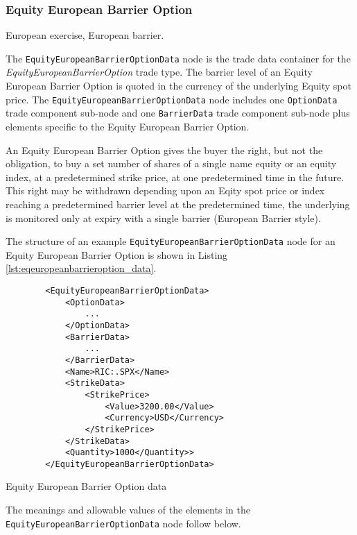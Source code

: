 \subsubsection{Equity European Barrier Option}

European exercise, European barrier.

The \lstinline!EquityEuropeanBarrierOptionData!  node is the trade data container for the \emph{EquityEuropeanBarrierOption} trade type. The barrier level of an Equity European Barrier Option is quoted in the currency of the 
underlying Equity spot price. The \lstinline!EquityEuropeanBarrierOptionData!  node includes one  \lstinline!OptionData! trade component sub-node and one \lstinline!BarrierData! trade component sub-node plus elements
specific to the Equity European Barrier Option. 

An Equity European Barrier Option gives the buyer the right, but not the obligation, to buy 
a set number of shares of a single name equity or an equity index, at a 
predetermined strike price, at one predetermined time in the future. This right may be withdrawn depending upon
an Eqity spot price or index reaching a predetermined barrier level at the predetermined time, the
underlying is monitored only at expiry with a single barrier (European Barrier style).

The structure of an example \lstinline!EquityEuropeanBarrierOptionData! node for an Equity European Barrier Option is shown in Listing
\ref{lst:eqeuropeanbarrieroption_data}.

\begin{listing}[H]
\begin{verbatim}
        <EquityEuropeanBarrierOptionData>
            <OptionData>
                ...
            </OptionData>
            <BarrierData>
                ...
            </BarrierData>
            <Name>RIC:.SPX</Name>
            <StrikeData>
                <StrikePrice>
					<Value>3200.00</Value>
					<Currency>USD</Currency>
				</StrikePrice>
            </StrikeData>
            <Quantity>1000</Quantity>>
        </EquityEuropeanBarrierOptionData>
\end{verbatim}
\caption{Equity European Barrier Option data}
\label{lst:eqeuropeanbarrieroption_data}
\end{listing}

The meanings and allowable values of the elements in the \lstinline!EquityEuropeanBarrierOptionData!  node follow below.

